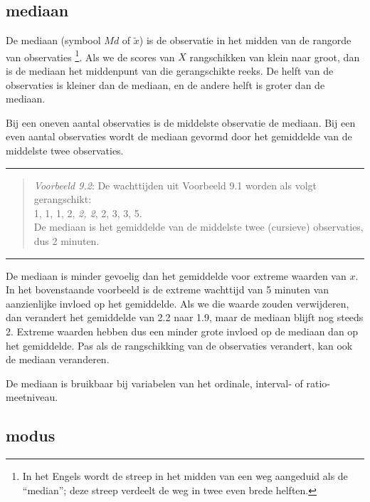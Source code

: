 \documentclass[
]{book}
\begin{document}
\hypertarget{sec:mediaan}{%
\subsection{mediaan}\label{sec:mediaan}}

De mediaan (symbool \(Md\) of \(\tilde{x}\)) is de observatie in het midden
van de rangorde van observaties \footnote{In het Engels wordt de streep in het midden van een weg aangeduid als de ``median''; deze streep verdeelt de weg in twee even brede helften.}. Als we de scores van \(X\)
rangschikken van klein naar groot, dan is de mediaan het middenpunt van
die gerangschikte reeks. De helft van de observaties is kleiner dan de
mediaan, en de andere helft is groter dan de mediaan.

Bij een oneven aantal observaties is de middelste observatie de mediaan.
Bij een even aantal observaties wordt de mediaan gevormd door het
gemiddelde van de middelste twee observaties.

\begin{center}\rule{0.5\linewidth}{0.5pt}\end{center}

\begin{quote}
\emph{Voorbeeld 9.2}: De wachttijden uit Voorbeeld 9.1
worden als volgt gerangschikt:\\
1, 1, 1, 2, \emph{2, 2}, 2, 3, 3, 5.\\
De mediaan is het gemiddelde van de middelste twee (cursieve)
observaties, dus 2 minuten.
\end{quote}

\begin{center}\rule{0.5\linewidth}{0.5pt}\end{center}

De mediaan is minder gevoelig dan het gemiddelde voor extreme waarden
van \(x\). In het bovenstaande voorbeeld is de extreme wachttijd van 5
minuten van aanzienlijke invloed op het gemiddelde. Als we die waarde
zouden verwijderen, dan verandert het gemiddelde van 2.2 naar 1.9, maar
de mediaan blijft nog steeds 2. Extreme waarden hebben dus een minder
grote invloed op de mediaan dan op het gemiddelde. Pas als de
rangschikking van de observaties verandert, kan ook de mediaan
veranderen.

De mediaan is bruikbaar bij variabelen van het ordinale, interval- of
ratio-meetniveau.

\hypertarget{modus}{%
\subsection{modus}\label{modus}}
\end{document}
